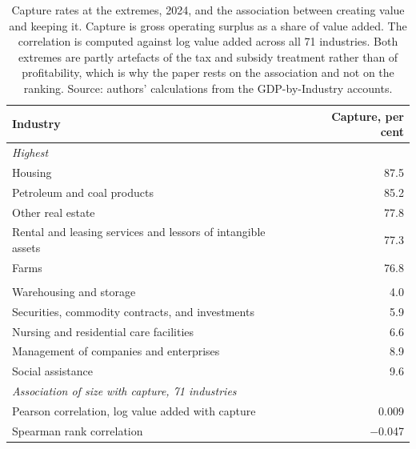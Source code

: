 \begin{table}[H]
\caption{Capture rates at the extremes, 2024, and the association between creating value and
keeping it. Capture is gross operating surplus as a share of value added. The correlation
is computed against log value added across all 71 industries. Both extremes are partly
artefacts of the tax and subsidy treatment rather than of profitability, which is why the
paper rests on the association and not on the ranking. Source: authors' calculations from
the GDP-by-Industry accounts.}
\label{tab:capture}
\begin{tabular}{lr}
\toprule
Industry & Capture, per cent \\
\midrule
\multicolumn{2}{l}{\emph{Highest}} \\
Housing & 87.5 \\
Petroleum and coal products & 85.2 \\
Other real estate & 77.8 \\
Rental and leasing services and lessors of intangible assets & 77.3 \\
Farms & 76.8 \\
\addlinespace
\multicolumn{2}{l}{\emph{Lowest}} \\
Warehousing and storage & 4.0 \\
Securities, commodity contracts, and investments & 5.9 \\
Nursing and residential care facilities & 6.6 \\
Management of companies and enterprises & 8.9 \\
Social assistance & 9.6 \\
\midrule
\multicolumn{2}{l}{\emph{Association of size with capture, 71 industries}} \\
Pearson correlation, log value added with capture & $\phantom{-}$0.009 \\
Spearman rank correlation & $-$0.047 \\
\bottomrule
\end{tabular}
\end{table}
